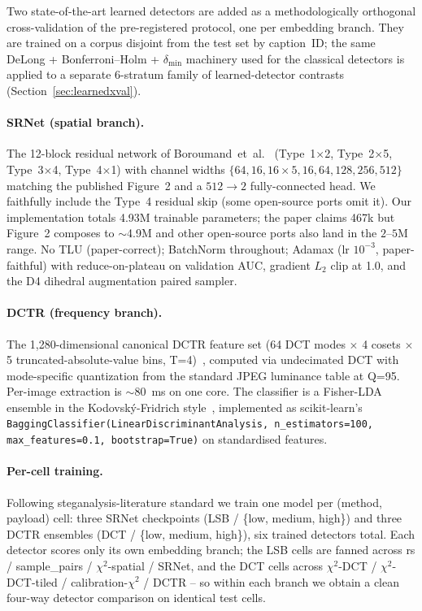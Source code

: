 \documentclass[10pt,twocolumn,a4paper]{article}
\begin{document}
Two state-of-the-art learned detectors are added as a methodologically orthogonal cross-validation of the pre-registered protocol, one per embedding branch. They are trained on a corpus disjoint from the test set by caption~ID; the same DeLong + Bonferroni--Holm + $\delta_\text{min}$ machinery used for the classical detectors is applied to a separate 6-stratum family of learned-detector contrasts (Section~\ref{sec:learnedxval}).

\paragraph{SRNet (spatial branch).} The 12-block residual network of Boroumand~et~al.~\cite{boroumand2019srnet} (Type~1$\times$2, Type~2$\times$5, Type~3$\times$4, Type~4$\times$1) with channel widths $\{64,16,16{\times}5,16,64,128,256,512\}$ matching the published Figure~2 and a $512{\rightarrow}2$ fully-connected head. We faithfully include the Type~4 residual skip (some open-source ports omit it). Our implementation totals 4.93M trainable parameters; the paper claims 467k but Figure~2 composes to $\sim$4.9M and other open-source ports also land in the $2$--$5$M range. No TLU (paper-correct); BatchNorm throughout; Adamax (lr $10^{-3}$, paper-faithful) with reduce-on-plateau on validation AUC, gradient $L_2$ clip at 1.0, and the D4 dihedral augmentation paired sampler.

\paragraph{DCTR (frequency branch).} The 1{,}280-dimensional canonical DCTR feature set (64 DCT modes $\times$ 4 cosets $\times$ 5 truncated-absolute-value bins, T=4)~\cite{holub2015dctr}, computed via undecimated DCT with mode-specific quantization from the standard JPEG luminance table at Q=95. Per-image extraction is $\sim$80~ms on one core. The classifier is a Fisher-LDA ensemble in the Kodovsk\'{y}-Fridrich style~\cite{fridrich2012srm}, implemented as scikit-learn's \texttt{BaggingClassifier(LinearDiscriminantAnalysis, n\_estimators=100, max\_features=0.1, bootstrap=True)} on standardised features.

\paragraph{Per-cell training.} Following steganalysis-literature standard we train one model per (method, payload) cell: three SRNet checkpoints (LSB / \{low, medium, high\}) and three DCTR ensembles (DCT / \{low, medium, high\}), six trained detectors total. Each detector scores only its own embedding branch; the LSB cells are fanned across rs / sample\_pairs / $\chi^2$-spatial / SRNet, and the DCT cells across $\chi^2$-DCT / $\chi^2$-DCT-tiled / calibration-$\chi^2$ / DCTR -- so within each branch we obtain a clean four-way detector comparison on identical test cells.
\end{document}

